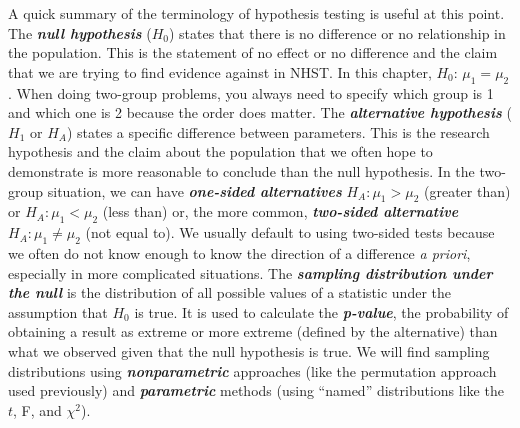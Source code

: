 \documentclass[
]{book}
\begin{document}
\indent A quick summary of the terminology of hypothesis testing
is useful at this
point. The \textbf{\emph{null hypothesis}} (\(H_0\)) states that there is no difference
or no relationship in the population. This is the statement of no effect or
no difference and the claim that we are trying to find evidence against in NHST. In
this chapter, \(H_0\): \(\mu_1 = \mu_2\). When doing two-group problems, you
always need to specify which group is 1 and which one is 2 because the order
does matter. The \textbf{\emph{alternative hypothesis}} (\(H_1\) or \(H_A\)) states a
specific difference between parameters. This is the research hypothesis and
the claim about the population that we often hope to demonstrate is more reasonable
to conclude than the null hypothesis. In the two-group situation, we can have
\textbf{\emph{one-sided alternatives}} \(H_A: \mu_1 > \mu_2\) (greater than) or
\(H_A: \mu_1 < \mu_2\) (less than) or, the more common, \textbf{\emph{two-sided
alternative}} \(H_A: \mu_1 \ne \mu_2\) (not equal to). We usually default to
using two-sided tests because we often do not know enough to know the
direction of a difference \emph{a priori}, especially in more complicated
situations. The \textbf{\emph{sampling distribution under the null}} is the
distribution of all possible values of a statistic under the assumption that
\(H_0\) is true. It
is used to calculate the \textbf{\emph{p-value}},
the probability of obtaining a
result as extreme or more extreme (defined by the alternative) than what we observed given that the null
hypothesis is true. We will find sampling distributions
using
\textbf{\emph{nonparametric}}
approaches (like the permutation  approach used previously)
and \textbf{\emph{parametric}}
methods (using ``named'' distributions like the
\(t\), F, and \(\chi^2\)).
\end{document}
